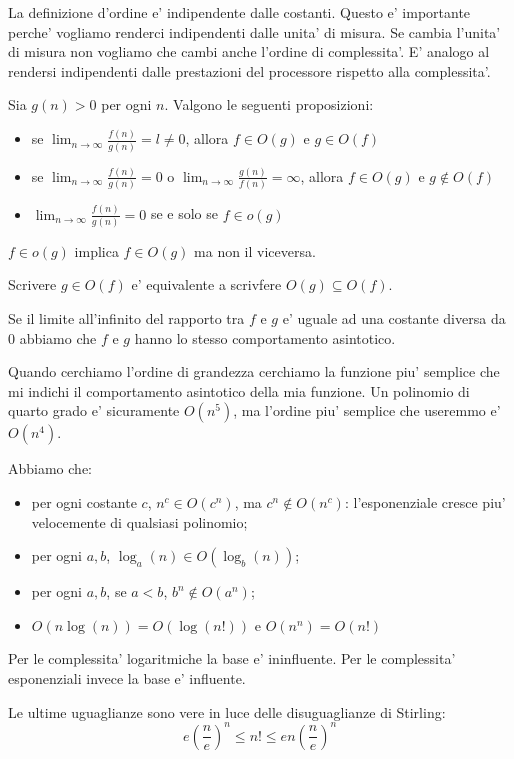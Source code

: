 La definizione d'ordine e' indipendente dalle costanti. Questo e' importante perche' vogliamo
renderci indipendenti dalle unita' di misura. Se cambia l'unita' di misura non vogliamo che cambi
anche l'ordine di complessita'. E' analogo al rendersi indipendenti dalle prestazioni del processore
rispetto alla complessita'.

Sia $g(n) > 0$ per ogni $n$. Valgono le seguenti proposizioni:
\begin{itemize}
    \item se $\lim_{n \to \infty}\frac{f(n)}{g(n)} = l \not= 0$, allora $f \in O(g)$ e $g \in
    O(f)$
    \item se $\lim_{n \to \infty}\frac{f(n)}{g(n)} = 0$ o $\lim_{n \to \infty}\frac{g(n)}{f(n)} =
    \infty$, allora $f \in O(g)$ e $g \notin O(f)$
    \item $\lim_{n \to \infty}\frac{f(n)}{g(n)} = 0$ se e solo se $f \in o(g)$
\end{itemize}

$f \in o(g)$ implica $f \in O(g)$ ma non il viceversa.

Scrivere $g \in O(f)$ e' equivalente a scrivfere $O(g) \subseteq O(f)$.

Se il limite all'infinito del rapporto tra $f$ e $g$ e' uguale ad una costante diversa da 0 abbiamo che
$f$ e $g$ hanno lo stesso comportamento asintotico.

Quando cerchiamo l'ordine di grandezza cerchiamo la funzione piu' semplice che mi indichi il
comportamento asintotico della mia funzione. Un polinomio di quarto grado e' sicuramente $O(n^{5})$,
ma l'ordine piu' semplice che useremmo e' $O(n^{4})$.

Abbiamo che:
\begin{itemize}
    \item per ogni costante $c$, $n^{c} \in O(c^{n})$, ma $c^{n} \notin O(n^{c})$: l'esponenziale
    cresce piu' velocemente di qualsiasi polinomio;
    \item per ogni $a,b$, $\log_{a}(n) \in O(\log_{b}(n))$;
    \item per ogni $a,b$, se $a < b$, $b^{n} \notin O(a^{n})$;
    \item $O(n \log(n)) = O(\log(n!))$ e $O(n^{n}) = O(n!)$ 
\end{itemize}

Per le complessita' logaritmiche la base e' ininfluente. Per le complessita' esponenziali invece la
base e' influente.

Le ultime uguaglianze sono vere in luce delle disuguaglianze di Stirling:
\begin{equation*}
    e\left(\frac{n}{e}\right)^{n} \leq n! \leq e n \left(\frac{n}{e}\right)^{n}
\end{equation*}

